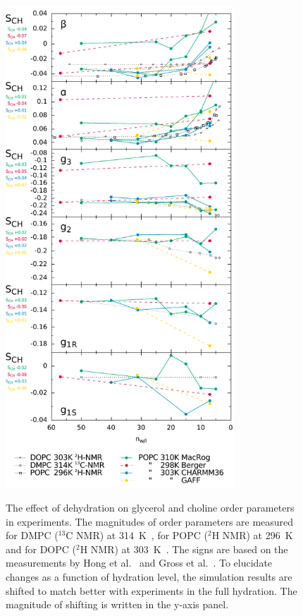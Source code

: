 \documentclass[journal=jacsat,manuscript=article]{achemso}
\begin{document}
\begin{figure}[]
  \centering
  \includegraphics[width=8.6cm]{../DATAreportediINblog/dehydration.pdf}
   \\
  \caption{\label{ordPhydr}
    The effect of dehydration on glycerol and choline order parameters in experiments.
    The magnitudes of order parameters are measured for DMPC ($^{13}$C NMR) at 314~K~\cite{dvinskikh05b}, 
    for POPC ($^2$H NMR) at 296~K~\cite{bechinger91} and for DOPC ($^2$H NMR) at 303~K~\cite{ulrich94}. 
    The signs are based on the measurements by Hong et al.~\cite{hong95a,hong95b} 
    and Gross et al.~\cite{gross97}. To elucidate changes as a function of hydration level, the 
    simulation results are shifted to match better with experiments in the full hydration.
    The magnitude of shifting is written in the y-axis panel.
  }
\end{figure}
\end{document}
